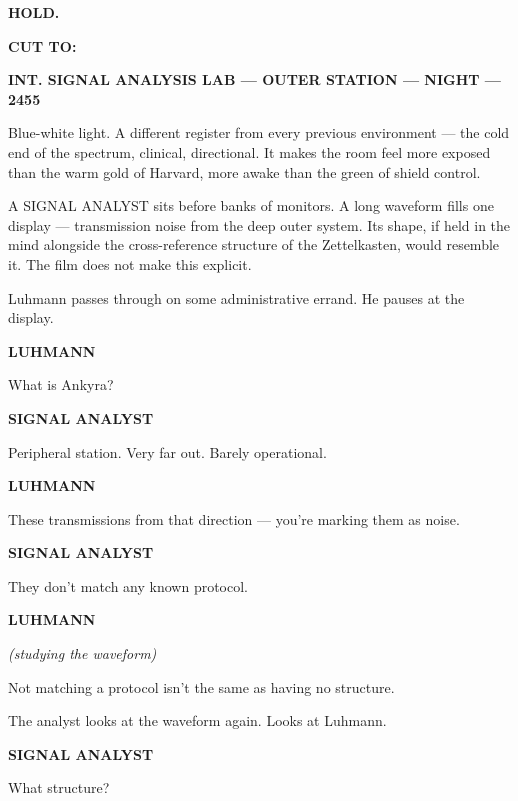 \documentclass[12pt]{article}
\newcommand{\sceneheading}[1]{%
  \vspace{10pt}%
  \noindent\textbf{#1}%
  \vspace{6pt}%
}
\newcommand{\trans}[1]{%
  \vspace{8pt}%
  \begin{flushright}\textbf{#1}\end{flushright}%
  \vspace{4pt}%
}
\newcommand{\character}[1]{%
  \vspace{8pt}%
  \begin{center}\textbf{#1}\end{center}%
  \vspace{-4pt}%
}
\newcommand{\paren}[1]{%
  \begin{center}\textit{(#1)}\end{center}%
  \vspace{-4pt}%
}
\newenvironment{dialogue}{%
  \begin{center}%
  \begin{minipage}{0.62\textwidth}%
}{%
  \end{minipage}%
  \end{center}%
  \vspace{4pt}%
}
\newenvironment{action}{%
  \vspace{4pt}%
  \noindent\ignorespaces%
}{%
  \vspace{6pt}%
}
\begin{document}
\textbf{HOLD.}

\trans{CUT TO:}

\sceneheading{INT. SIGNAL ANALYSIS LAB — OUTER STATION — NIGHT — 2455}

\begin{action}
Blue-white light. A different register from every previous environment — the cold end of the spectrum, clinical, directional. It makes the room feel more exposed than the warm gold of Harvard, more awake than the green of shield control.

\medskip

A SIGNAL ANALYST sits before banks of monitors. A long waveform fills one display — transmission noise from the deep outer system. Its shape, if held in the mind alongside the cross-reference structure of the Zettelkasten, would resemble it. The film does not make this explicit.

\medskip

Luhmann passes through on some administrative errand. He pauses at the display.
\end{action}

\character{LUHMANN}
\begin{dialogue}
What is Ankyra?
\end{dialogue}

\character{SIGNAL ANALYST}
\begin{dialogue}
Peripheral station. Very far out. Barely operational.
\end{dialogue}

\character{LUHMANN}
\begin{dialogue}
These transmissions from that direction — you're marking them as noise.
\end{dialogue}

\character{SIGNAL ANALYST}
\begin{dialogue}
They don't match any known protocol.
\end{dialogue}

\character{LUHMANN}
\paren{studying the waveform}
\begin{dialogue}
Not matching a protocol isn't the same as having no structure.
\end{dialogue}

\begin{action}
The analyst looks at the waveform again. Looks at Luhmann.
\end{action}

\character{SIGNAL ANALYST}
\begin{dialogue}
What structure?
\end{dialogue}
\end{document}
